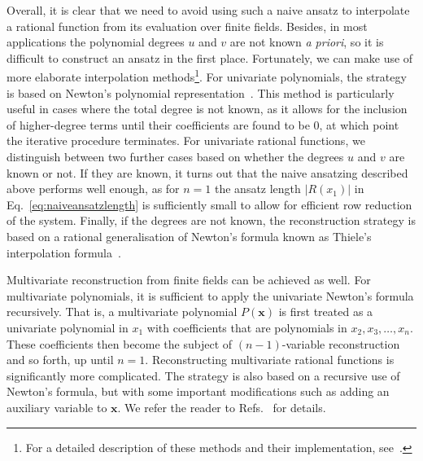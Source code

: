 \documentclass[main.tex]{subfiles}
\begin{document}
Overall, it is clear that we need to avoid using such a naive ansatz to interpolate a rational function from its evaluation over finite fields. Besides, in most applications the polynomial degrees $u$ and $v$ are not known \textit{a priori}, so it is difficult to construct an ansatz in the first place. Fortunately, we can make use of more elaborate interpolation methods\footnote{For a detailed description of these methods and their implementation, see~\cite{Peraro:2016wsq}.}. For univariate polynomials, the strategy is based on Newton's polynomial representation~\cite{Abramowitz1965HandbookOM}. This method is particularly useful in cases where the total degree is not known, as it allows for the inclusion of higher-degree terms until their coefficients are found to be 0, at which point the iterative procedure terminates. For univariate rational functions, we distinguish between two further cases based on whether the degrees $u$ and $v$ are known or not. If they are known, it turns out that the naive ansatzing described above performs well enough, as for $n=1$ the ansatz length $|R(x_1)|$ in Eq.~\ref{eq:naiveansatzlength} is sufficiently small to allow for efficient row reduction of the system. Finally, if the degrees are not known, the reconstruction strategy is based on a rational generalisation of Newton's formula known as Thiele's interpolation formula~\cite{Abramowitz1965HandbookOM}. 

Multivariate reconstruction from finite fields can be achieved as well. For multivariate polynomials, it is sufficient to apply the univariate Newton's formula recursively. That is, a multivariate polynomial $P(\mathbf{x})$ is first treated as a univariate polynomial in $x_1$ with coefficients that are polynomials in $x_2, x_3, \ldots, x_n$. These coefficients then become the subject of $(n-1)$-variable reconstruction and so forth, up until $n=1$. Reconstructing multivariate rational functions is significantly more complicated. The strategy is also based on a recursive use of Newton's formula, but with some important modifications such as adding an auxiliary variable to $\mathbf{x}$. We refer the reader to Refs.~\cite{CUYT20111445, Peraro:2016wsq} for details.
\end{document}
